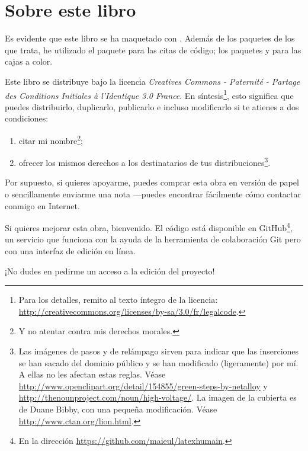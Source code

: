 \section*{Sobre este libro}\thispagestyle{plain}

Es evidente que este libro se ha maquetado con \XeLaTeX. Además de los paquetes de los que trata, he utilizado el paquete  para las citas de código; los paquetes  y  para las cajas a color.

Este libro se distribuye bajo la licencia \emph{Creatives Commons - Paternité - Partage des Conditions Initiales à l'Identique 3.0 France}. En síntesis\footnote{Para los detalles, remito al texto íntegro de la licencia: \url{http://creativecommons.org/licenses/by-sa/3.0/fr/legalcode}.}, esto significa que puedes distribuirlo, duplicarlo, publicarlo e incluso modificarlo si te atienes a dos condiciones:
\begin{enumerate}
\item citar mi nombre\footnote{Y no atentar contra mis derechos morales.};
\item ofrecer los mismos derechos a los destinatarios de tus distribuciones\footnote{Las imágenes de pasos y de relámpago sirven para indicar que las inserciones se han sacado del dominio público y se han modificado (ligeramente) por mí. A ellas no les afectan estas reglas. Véase \url{http://www.openclipart.org/detail/154855/green-steps-by-netalloy} y \url{http://thenounproject.com/noun/high-voltage/}. La imagen de la cubierta es de  Duane  Bibby, con una pequeña modificación. Véase \url{http://www.ctan.org/lion.html}.}.
\end{enumerate}

Por supuesto, si quieres apoyarme, puedes comprar esta obra en versión de papel o sencillamente enviarme una nota ---puedes encontrar fácilmente cómo contactar conmigo en Internet.

Si quieres mejorar esta obra, bienvenido. El código está disponible en GitHub\footnote{En la dirección \url{https://github.com/maieul/latexhumain}.}, un servicio que funciona con la ayuda de la herramienta de colaboración Git pero con una interfaz de edición en línea.

¡No dudes en pedirme un acceso a la edición del proyecto!
